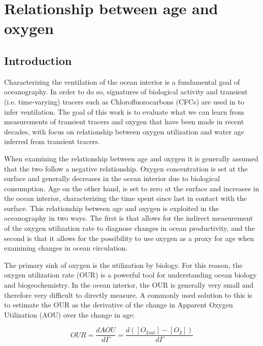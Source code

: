 \graphicspath{{figures/chapter-oxygen/}}

\chapter{Relationship between age and oxygen}
\label{cha:oxygen}

\section{Introduction}
Characterizing the ventilation of the ocean interior is a fundamental goal of
oceanography. In order to do so, signatures of biological activity and transient
(i.e. time-varying) tracers such as Chlorofluorocarbons (CFCs) are used in to
infer ventilation. The goal of this work is to evaluate what we can learn from
measurements of transient tracers and oxygen that have been made in recent
decades, with focus on relationship between oxygen utilization and water age
inferred from transient tracers.

When examining the relationship between age and oxygen it is generally assumed
that the two follow a negative relationship. Oxygen concentration is set at the
surface and generally decreases in the ocean interior due to biological
consumption. Age on the other hand, is set to zero at the surface and increases
in the ocean interior, characterizing the time spent since last in contact with
the surface. This relationship between age and oxygen is exploited in the
oceanography in two ways. The first is that allows for the indirect measurement
of the oxygen utilization rate to diagnose changes in ocean productivity, and
the second is that it allows for the possibility to use oxygen as a proxy for
age when examining changes in ocean circulation.

The primary sink of oxygen is the utilization by biology. For this reason, the
oxygen utilization rate (OUR) is a powerful tool for understanding ocean biology
and biogeochemistry. In the ocean interior, the OUR is generally very small and
therefore very difficult to directly measure. A commonly used solution to this is
to estimate the OUR as the derivative of the change in Apparent Oxygen Utilization
(AOU) over the change in age:

\begin{equation}
  OUR = \frac{dAOU}{d\Gamma} = \frac{d([O_{2 sat}] - [O_2])}{d\Gamma}
\end{equation}

